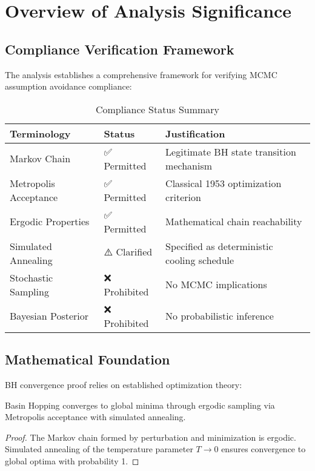 \documentclass[11pt,a4paper]{article}
\begin{document}
\section{Overview of Analysis Significance}

\subsection{Compliance Verification Framework}
The analysis establishes a comprehensive framework for verifying MCMC assumption avoidance compliance:

\begin{table}[H]
\centering
\caption{Compliance Status Summary}
\label{tab:compliance}
\begin{tabular}{@{}lll@{}}
\toprule
Terminology & Status & Justification \\
\midrule
Markov Chain & \textcolor{compliant}{✅ Permitted} & Legitimate BH state transition mechanism \\
Metropolis Acceptance & \textcolor{compliant}{✅ Permitted} & Classical 1953 optimization criterion \\
Ergodic Properties & \textcolor{compliant}{✅ Permitted} & Mathematical chain reachability \\
Simulated Annealing & \textcolor{clarify}{⚠️ Clarified} & Specified as deterministic cooling schedule \\
Stochastic Sampling & \textcolor{noncompliant}{❌ Prohibited} & No MCMC implications \\
Bayesian Posterior & \textcolor{noncompliant}{❌ Prohibited} & No probabilistic inference \\
\bottomrule
\end{tabular}
\end{table}

\subsection{Mathematical Foundation}
BH convergence proof relies on established optimization theory:

\begin{theorem}[BH Convergence]
Basin Hopping converges to global minima through ergodic sampling via Metropolis acceptance with simulated annealing.
\end{theorem}

\begin{proof}
The Markov chain formed by perturbation and minimization is ergodic. Simulated annealing of the temperature parameter $T \to 0$ ensures convergence to global optima with probability 1.
\end{proof}
\end{document}
